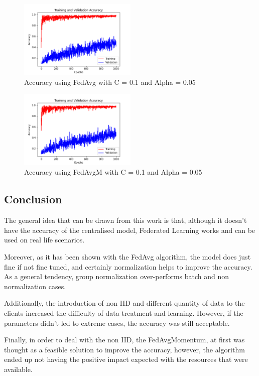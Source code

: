 \documentclass[twocolumn]{article}
\begin{document}
\begin{figure}
    \centering
    \includegraphics[width=0.5\textwidth,height=.3\textheight]{10_AccuracyFedAvg_C0.1A_0.05.png}
    \caption{Accuracy using FedAvg with C = 0.1 and Alpha = 0.05}
     \label{AccFedAvgC0.1A0.05} 
\end{figure}

\begin{figure}
    \centering
    \includegraphics[width=0.5\textwidth,height=.3\textheight]{10_AccuracyFedAvgM_C0.1_A0.05.png}
    \caption{Accuracy using FedAvgM with C = 0.1 and Alpha = 0.05}
     \label{AccFedAvgMC0.1A0.05} 
\end{figure}





\subsection{Conclusion}
The general idea that can be drawn from this work is that, although it doesn't have the accuracy of the centralised model, Federated Learning works and can be used on real life scenarios.

Moreover, as it has been shown with the FedAvg algorithm, the model does just fine if not fine tuned, and certainly normalization helps to improve the accuracy. As a general tendency, group normalization over-performs batch and non normalization cases. 

Additionally, the introduction of non IID and different quantity of data to the clients increased the difficulty of data treatment and learning. However, if the parameters didn't led to extreme cases, the accuracy was still acceptable.

Finally, in order to deal with the non IID, the FedAvgMomentum, at first was thought as a feasible solution to improve the accuracy, however, the algorithm ended up not having the positive impact expected with the resources that were available.

\printbibliography
\end{document}
